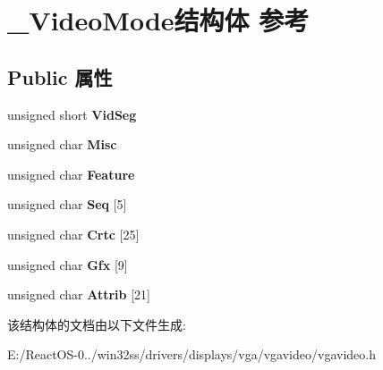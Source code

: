\hypertarget{struct___video_mode}{}\section{\+\_\+\+Video\+Mode结构体 参考}
\label{struct___video_mode}
\subsection*{Public 属性}
\begin{DoxyCompactItemize}
\item 
\mbox{\label{struct___video_mode_a10eb1486bdda12ad7e183571a97278a3}} 
unsigned short {\bfseries Vid\+Seg}
\item 
\mbox{\label{struct___video_mode_a408fbe001cf1234500ba7713df642d5a}} 
unsigned char {\bfseries Misc}
\item 
\mbox{\label{struct___video_mode_aab212fed0f773272f1e8dc1cd3dc0f38}} 
unsigned char {\bfseries Feature}
\item 
\mbox{\label{struct___video_mode_ab727af5b4862be37babf42c458c7b3b2}} 
unsigned char {\bfseries Seq} \mbox{[}5\mbox{]}
\item 
\mbox{\label{struct___video_mode_a625ceb9497aa91481a8a446a36db328a}} 
unsigned char {\bfseries Crtc} \mbox{[}25\mbox{]}
\item 
\mbox{\label{struct___video_mode_aed645ddba6059ebd73d52400c8d745a6}} 
unsigned char {\bfseries Gfx} \mbox{[}9\mbox{]}
\item 
\mbox{\label{struct___video_mode_a340f242cea376fc538b9bc7a679fc76e}} 
unsigned char {\bfseries Attrib} \mbox{[}21\mbox{]}
\end{DoxyCompactItemize}


该结构体的文档由以下文件生成\+:\begin{DoxyCompactItemize}
\item 
E\+:/\+React\+O\+S-\/0../win32ss/drivers/displays/vga/vgavideo/vgavideo.\+h\end{DoxyCompactItemize}
